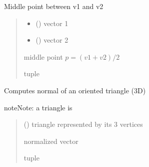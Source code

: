 \documentclass[letterpaper,10pt,english]{sphinxmanual}
\begin{document}
\begin{fulllineitems}
\label{\detokenize{reference:basicgeometry.middle}}
\pysigstartsignatures
{}
\pysigstopsignatures
\sphinxAtStartPar
Middle point between v1 and v2
\begin{quote}\begin{description}
\begin{itemize}
\item {} 
\sphinxAtStartPar
{} () \textendash{} vector 1

\item {} 
\sphinxAtStartPar
{} () \textendash{} vector 2

\end{itemize}

\sphinxAtStartPar
middle point \(p = (v1+v2)/2\)

\sphinxhyphen{}tuple

\end{description}\end{quote}

\end{fulllineitems}


\begin{fulllineitems}
\label{\detokenize{reference:basicgeometry.triangle_normal}}
\pysigstartsignatures
{}
\pysigstopsignatures
\sphinxAtStartPar
Computes normal of an oriented triangle (3D)

\begin{sphinxadmonition}{note}{Note:}
\sphinxAtStartPar
a triangle is \sphinxcode{\sphinxupquote{{[}(x1,y1,z1),(x2,y2,z2),(x3,y3,z3){]}}}
\end{sphinxadmonition}
\begin{quote}\begin{description}
\sphinxAtStartPar
{} () \textendash{} triangle represented by its 3 vertices

\sphinxAtStartPar
normalized vector

\sphinxhyphen{}tuple

\end{description}\end{quote}

\end{fulllineitems}
\end{document}
